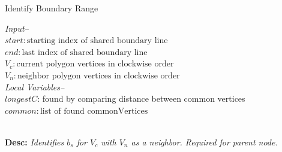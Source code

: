 \begin{algorithm}[t]
\footnotesize
\caption{Identify Boundary Range}
\textit{Input--}\\
$start: \text{starting index of shared boundary line}$\\ 
$end: \text{last index of shared boundary line}$\\
$V_c: \text{current polygon vertices in clockwise order}$\\
$V_n: \text{neighbor polygon vertices in clockwise order}$\\
\textit{Local Variables--}\\
$longestC$: found by comparing  distance between common vertices\\
$common: \text{list of found commonVertices}$
\begin{algorithmic}[1]
\IfEnd
{}
\EndProcedure 
\end{algorithmic} \label{alg:sharedBoundary1}

~\\
\textbf{Desc: }\emph{Identifies $b_{s}$ for $V_c$ with $V_n$ as a neighbor. Required for parent node. }
\end{algorithm}
